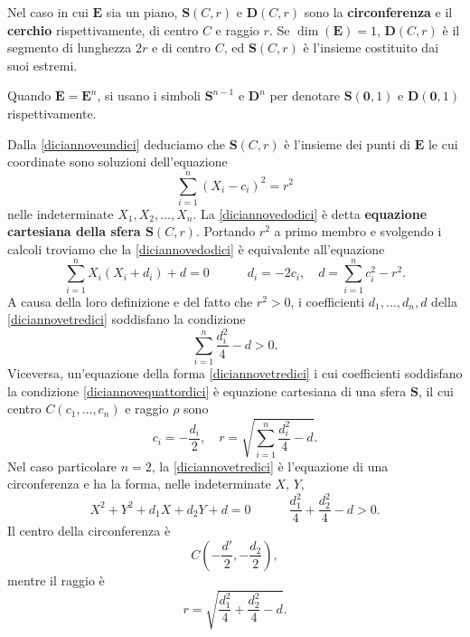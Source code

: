 \documentclass{article}
\theoremstyle{plain}
\theoremstyle{definition}
\theoremstyle{remark}
\begin{document}
\vspace{10pt}

Nel caso in cui $\mathbf{E}$ sia un piano, $\mathbf{S}(C, r)$ e $\mathbf{D}(C, r)$ sono la 
\textbf{circonferenza} e il \textbf{cerchio} rispettivamente, di centro $C$ e raggio $r$.
Se $\dim(\mathbf{E}) = 1$, $\mathbf{D}(C, r)$ è il segmento di lunghezza $2r$ e di centro $C$, ed 
$\mathbf{S}(C, r)$ è l'insieme costituito dai suoi estremi.

\vspace{10pt}

Quando $\mathbf{E} = \mathbf{E}^n$, si usano i simboli $\mathbf{S}^{n-1}$ e $\mathbf{D}^n$ per denotare 
$\mathbf{S}(\mathbf{0}, 1)$ e $\mathbf{D}(\mathbf{0}, 1)$ rispettivamente.

\vspace{10pt}

Dalla \ref{diciannoveundici} deduciamo che $\mathbf{S}(C, r)$ è l'insieme dei punti di $\mathbf{E}$ le cui 
coordinate sono soluzioni dell'equazione
\begin{equation}\label{diciannovedodici}
\sum_{i=1}^{n}(X_i - c_i)^2 = r^2 
\end{equation}
nelle indeterminate $X_1, X_2, \ldots, X_n$. La \ref{diciannovedodici} è detta \textbf{equazione cartesiana della sfera $\mathbf{S}(C, r)$}. 
Portando $r^2$ a primo membro e svolgendo i calcoli troviamo che la \ref{diciannovedodici} è equivalente 
all'equazione
\begin{equation}\label{diciannovetredici}
\sum_{i=1}^{n}X_i(X_i+d_i) + d = 0\quad\quad\quad d_i = -2c_i,\quad d = \sum_{i=1}^{n}c_i^2 - r^2.
\end{equation}
A causa della loro definizione 
e del fatto che $r^2 > 0$, i coefficienti $d_1, \ldots, d_n, d$ della \ref{diciannovetredici} soddisfano la condizione
\begin{equation}\label{diciannovequattordici}
\sum_{i=1}^{n}\dfrac{d_i^2}{4} - d > 0.
\end{equation}
Viceversa, un'equazione della forma \ref{diciannovetredici} i cui coefficienti soddisfano la condizione 
\ref{diciannovequattordici} è equazione cartesiana di una sfera $\mathbf{S}$, il cui centro 
$C(c_1, \ldots, c_n)$ e raggio $\rho$ sono
\[c_i = -\frac{d_i}{2}, \quad r = \sqrt{\sum_{i=1}^{n}\dfrac{d_i^2}{4} - d}.\]
Nel caso particolare $n = 2$, la \ref{diciannovetredici} è l'equazione di una circonferenza e ha la forma, 
nelle indeterminate $X$, $Y$,
\begin{equation}\label{diciannovequindici}
X^2 + Y^2 + d_1 X + d_2 Y + d = 0 \quad\quad\quad\dfrac{d_1^2}{4} + \dfrac{d_2^2}{4} - d > 0.
\end{equation}
Il centro della circonferenza è 
\[C\left(-\frac{d'}{2}, -\frac{d_2}{2}\right),\]
mentre il raggio è
\[r = \sqrt{\dfrac{d_1^2}{4} + \frac{d_2^2}{4} - d}.\]
\end{document}
